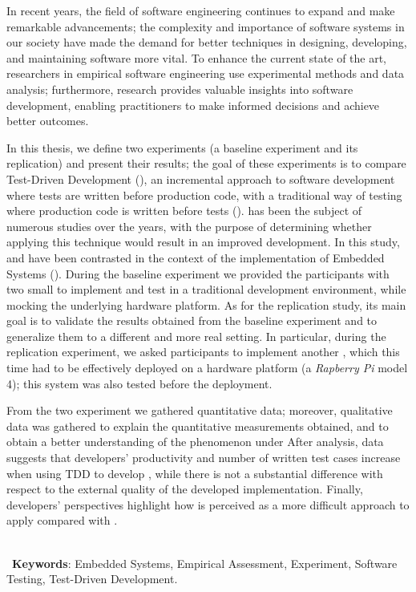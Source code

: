 In recent years, the field of software engineering continues to expand and make remarkable advancements; the complexity and importance of software systems in our society have made the demand for better techniques in designing, developing, and maintaining software more vital. To enhance the current state of the art, researchers in empirical software engineering use experimental methods and data analysis; furthermore, research provides valuable insights into software development, enabling practitioners to make informed decisions and achieve better outcomes.

In this thesis, we define two experiments (\ie a baseline experiment and its replication) and present their results; the goal of these experiments is to compare Test-Driven Development (\tdd), an incremental approach to software development where tests are written before production code, with a traditional way of testing where production code is written before tests (\ie \notdd). \tdd has been the subject of numerous studies over the years, with the purpose of determining whether applying this technique would result in an improved development. 
In this study, \tdd and \notdd have been contrasted in the context of the implementation of Embedded Systems (\ess).
During the baseline experiment we provided the participants with two small \ess to implement and test in a traditional development environment, while mocking the underlying hardware platform.
As for the replication study, its main goal is to validate the results obtained from the baseline experiment and to generalize them to a different and more real setting. 
In particular, during the replication experiment, we asked participants to implement another \es, which this time had to be effectively deployed on a hardware platform (a \textit{Rapberry Pi} model 4); this system was also tested before the deployment.

From the two experiment we gathered quantitative data; moreover, qualitative data was gathered to explain the quantitative measurements obtained, and to obtain a better understanding of the phenomenon under
After analysis, data suggests that developers' productivity and number of written test cases increase when using TDD to develop \ess, while there is not a substantial difference with respect to the external quality of the developed implementation. 
Finally, developers' perspectives highlight how \tdd is perceived as a more difficult approach to apply compared with \notdd.

\ \\ \
\noindent \textbf{Keywords}: Embedded Systems, Empirical Assessment, Experiment, Software Testing, Test-Driven Development.